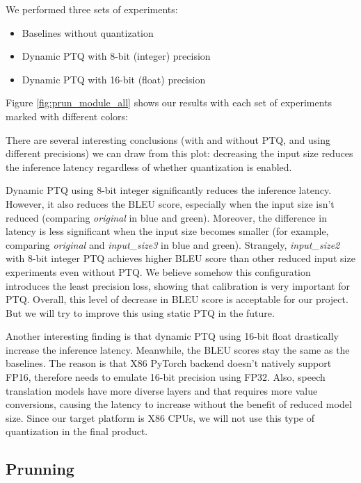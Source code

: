 \documentclass[11pt]{article}
\begin{document}
We performed three sets of experiments:
\begin{itemize}
    \item  Baselines without quantization
    \item Dynamic PTQ with 8-bit (integer) precision
    \item Dynamic PTQ with 16-bit (float) precision
\end{itemize}

Figure \ref{fig:prun_module_all} shows our results with each set of experiments marked with different colors:

There are several interesting conclusions (with and without PTQ, and using different precisions) we can draw from this plot: decreasing the input size reduces the inference latency regardless of whether quantization is enabled.

Dynamic PTQ using 8-bit integer significantly reduces the inference latency.
However, it also reduces the BLEU score, especially when the input size isn't reduced (comparing \textit{original} in blue and
green).
Moreover, the difference in latency is less significant when the input size becomes smaller (for example,
comparing \textit{original} and \textit{input\_size3} in blue and green).
Strangely, \textit{input\_size2} with 8-bit integer PTQ achieves higher BLEU score than other reduced input size experiments
even without PTQ.
We believe somehow this configuration introduces the least precision loss, showing that calibration is very important for PTQ.
Overall, this level of decrease in BLEU score is acceptable for our project.
But we will try to improve this using static PTQ in the future.

Another interesting finding is that dynamic PTQ using 16-bit float drastically increase the inference latency.
Meanwhile, the BLEU scores stay the same as the baselines.
The reason is that X86 PyTorch backend doesn't natively support FP16, therefore needs to emulate 16-bit precision using FP32.
Also, speech translation models have more diverse layers and that requires more value conversions, causing the latency to increase without the benefit of reduced model size.
Since our target platform is X86 CPUs, we will not use this type of quantization in the final product.




\subsection{Prunning}
\end{document}
